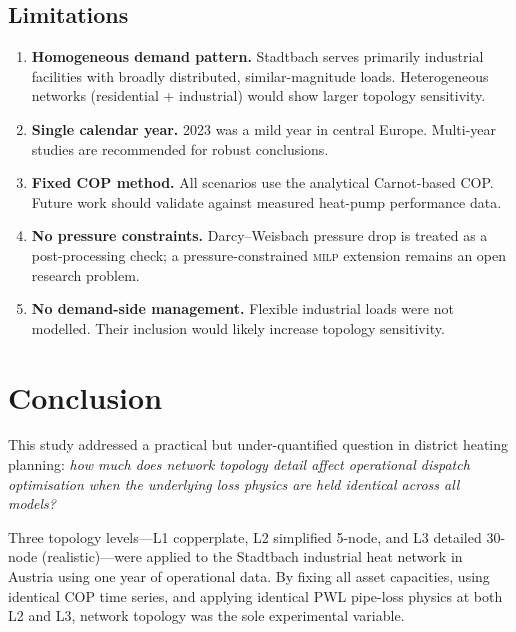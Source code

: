 \documentclass[a4paper,fleqn]{cas-sc}
\newcommand{\milp}{\textsc{milp}}
\begin{document}
\subsection{Limitations}

\begin{enumerate}
  \item \textbf{Homogeneous demand pattern.}  Stadtbach serves primarily
        industrial facilities with broadly distributed, similar-magnitude
        loads.  Heterogeneous networks (residential + industrial) would
        show larger topology sensitivity.

  \item \textbf{Single calendar year.}  2023 was a mild year in central
        Europe.  Multi-year studies are recommended for robust conclusions.

  \item \textbf{Fixed COP method.}  All scenarios use the analytical
        Carnot-based COP.  Future work should validate against measured
        heat-pump performance data.

  \item \textbf{No pressure constraints.}  Darcy--Weisbach pressure drop
        is treated as a post-processing check; a pressure-constrained \milp{}
        extension remains an open research problem.

  \item \textbf{No demand-side management.}  Flexible industrial loads
        were not modelled.  Their inclusion would likely increase topology
        sensitivity.
\end{enumerate}

\section{Conclusion}
\label{sec:conclusion}

This study addressed a practical but under-quantified question in district
heating planning: \emph{how much does network topology detail affect
operational dispatch optimisation when the underlying loss physics are
held identical across all models?}

Three topology levels---L1 copperplate, L2 simplified 5-node, and L3
detailed 30-node (realistic)---were applied to the Stadtbach industrial
heat network in Austria using one year of operational data.  By fixing
all asset capacities, using identical COP time series, and applying
identical PWL pipe-loss physics at both L2 and L3, network topology was
the sole experimental variable.
\end{document}
